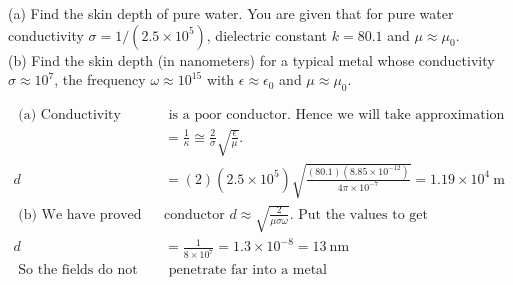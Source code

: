 \begin{exercise}
 (a) Find the skin depth of pure water. You are given that for pure water conductivity $\sigma=1 /\left(2.5 \times 10^{5}\right)$, dielectric constant $k=80.1$ and $\mu \approx \mu_{0}$.\\
 (b) Find the skin depth (in nanometers) for a typical metal whose conductivity $\sigma \approx 10^{7}$, the frequency $\omega \approx 10^{15}$ with $\epsilon \approx \epsilon_{0}$ and $\mu \approx \mu_{0}$.
\end{exercise}
\begin{answer}
	\begin{align*}
\text{	 (a) Conductivity shows that the water}&\text{ is a poor conductor. Hence we will take approximation }\\
	 &=\frac{1}{\kappa} \cong \frac{2}{\sigma} \sqrt{\frac{\epsilon}{\mu}} .\\
	d&=(2)\left(2.5 \times 10^{5}\right) \sqrt{\frac{(80.1)\left(8.85 \times 10^{-12}\right)}{4 \pi \times 10^{-7}}}=1.19 \times 10^{4} \mathrm{~m}\\
\text{	(b) We have proved that for good }&\text{conductor $d \approx \sqrt{\frac{2}{\mu \sigma \omega}}$. Put the values to get}\\
	d&=\frac{1}{8 \times 10^{7}}=1.3 \times 10^{-8}=13 \mathrm{~nm}\\
\text{	So the fields do not}&\text{ penetrate far into a metal}	
	\end{align*}
\end{answer}
